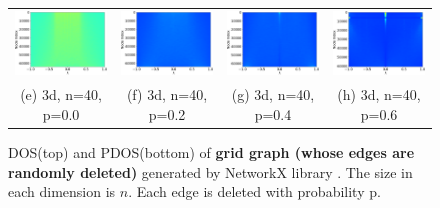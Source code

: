 \documentclass[senior,final,11pt]{iscs-thesis}
\begin{document}
\begin{figure}[htbp]
\begin{tabular}{cccc}
    \includegraphics[width=45mm]{figure/grid_graph_deleted_dim(40,40,40)_pdel00txt_pdos.png} &
    \includegraphics[width=45mm]{figure/grid_graph_deleted_dim(40,40,40)_pdel02txt_pdos.png} &
    \includegraphics[width=45mm]{figure/grid_graph_deleted_dim(40,40,40)_pdel04txt_pdos.png} &
    \includegraphics[width=45mm]{figure/grid_graph_deleted_dim(40,40,40)_pdel06txt_pdos.png} \\
    (e) 3d, n=40, p=0.0 & (f) 3d, n=40, p=0.2 &(g) 3d, n=40, p=0.4  & (h) 3d, n=40, p=0.6 \\
  \end{tabular}
  \caption{DOS(top) and PDOS(bottom) of {\bf grid graph (whose edges are randomly deleted)} generated by NetworkX library \cite{SciPyProceedings_11}.  The size in each dimension is $n$. Each edge is deleted with probability p.}
  \label{fig:grid_deleted}
\end{figure}
\end{document}
